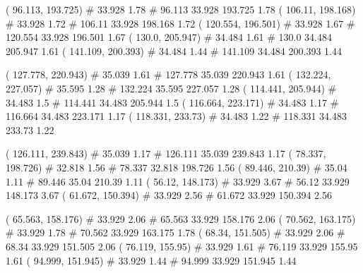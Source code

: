 \documentclass[a4paper,openbib,10pt]{article}
\newenvironment{treegraph}{\begin{graph}}{\end{graph}}
\begin{document}
\begin{treegraph}
  ( 96.113, 193.725) #     33.928    1.78
   #    96.113    33.928    193.725    1.78
  ( 106.11, 198.168) #     33.928    1.72
   #    106.11    33.928    198.168    1.72
  ( 120.554, 196.501) #     33.928    1.67
   #    120.554    33.928    196.501    1.67
  ( 130.0, 205.947) #     34.484    1.61
   #    130.0    34.484    205.947    1.61
  ( 141.109, 200.393) #     34.484    1.44
   #    141.109    34.484    200.393    1.44

  ( 127.778, 220.943) #     35.039    1.61
   #    127.778    35.039    220.943    1.61
  ( 132.224, 227.057) #     35.595    1.28
   #    132.224    35.595    227.057    1.28
  ( 114.441, 205.944) #     34.483    1.5
   #    114.441    34.483    205.944    1.5
  ( 116.664, 223.171) #     34.483    1.17
   #    116.664    34.483    223.171    1.17
  ( 118.331, 233.73) #     34.483    1.22
   #    118.331    34.483    233.73    1.22

  ( 126.111, 239.843) #     35.039    1.17
   #    126.111    35.039    239.843    1.17
  ( 78.337, 198.726) #     32.818    1.56
   #    78.337    32.818    198.726    1.56
  ( 89.446, 210.39) #     35.04    1.11
   #    89.446    35.04    210.39    1.11
  ( 56.12, 148.173) #     33.929    3.67
   #    56.12    33.929    148.173    3.67
  ( 61.672, 150.394) #     33.929    2.56
   #    61.672    33.929    150.394    2.56

  ( 65.563, 158.176) #     33.929    2.06
   #    65.563    33.929    158.176    2.06
  ( 70.562, 163.175) #     33.929    1.78
   #    70.562    33.929    163.175    1.78
  ( 68.34, 151.505) #     33.929    2.06
   #    68.34    33.929    151.505    2.06
  ( 76.119, 155.95) #     33.929    1.61
   #    76.119    33.929    155.95    1.61
  ( 94.999, 151.945) #     33.929    1.44
   #    94.999    33.929    151.945    1.44


\end{treegraph}
\end{document}
